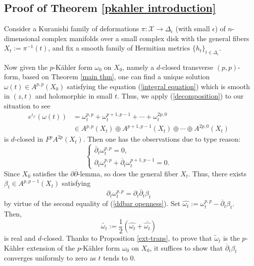 \documentclass[12pt]{amsart}
\numberwithin{equation}{section}
\theoremstyle{definition}
\theoremstyle{definition}
\theoremstyle{definition}
\renewcommand{\1}{\mathsf{1}}
\newcommand{\db}{\overline{\partial}}
\renewcommand{\>}{\rightarrow}
\newcommand{\p}{\partial}
\newcommand{\bp}{\overline\partial}
\def\p{\partial}
\theoremstyle{plain} %
\theoremstyle{plain} %
\theoremstyle{plain} %
\begin{document}
	
	
	
	\subsection{Proof of Theorem \ref{pkahler introduction}}\label{proof pkahler}
	Consider a Kuranishi family of deformations
	$\pi:\mathcal{X}\rightarrow \Delta_{\epsilon}$  (with small $\epsilon$) of $n$-dimensional complex manifolds over a small complex disk
	with the general fibers $X_t:=\pi^{-1}(t)$, and	fix a smooth family of  Hermitian metrics
	$\{h_t\}_{t \in \Delta_{\epsilon}}.$ 
    
Now given the $p$-K\"{a}hler form $\omega_0$ on $X_0$, namely a $d$-closed transverse $(p,p)$-form, based on Theorem   \ref{main thm}, one can find a unique solution $\omega(t)\in A^{p,p}(X_0)$ satisfying the equation (\ref{integral equation}) which is smooth in $(z,t)$ and holomorphic in small $t$. Thus, we apply (\ref{decomposition}) to our situation to see
	$$
	\begin{aligned}
		e^{\iota_{\varphi}}(\omega(t)) &=\omega_t^{p, p}+\omega_t^{p+1, p-1}+\cdots+\omega_t^{2p, 0} \\
		& \in A^{p, p}\left(X_{t}\right) \oplus A^{p+1, p-1}\left(X_{t}\right) \oplus \cdots \oplus A^{2p, 0}\left(X_{t}\right)
	\end{aligned}
	$$
	is $d$-closed in $F^{p}A^{2p}(X_t).$ Then one has the observations due to  type reason:
	\begin{equation}\label{ddbar openness}
		\begin{cases}
			\bp_{t}{\omega_t^{p, p}}=0,\\
			\p_t{\omega_t^{p, p}}+	\bp_{t}{\omega_t^{p+1, p-1}}=0.
		\end{cases}
	\end{equation}
	Since $X_0$ satisfies the $\p\db$-lemma, so does the general fiber
	$X_t$. Thus, there exists $\beta_t\in A^{p,p-1}(X_t)$ satisfying  $$\p_t{\omega_t^{p, p}}=\p_t\bp_{t}\beta_t$$ by virtue of the second equality of (\ref{ddbar openness}). Set
	$\widehat{\omega_t}:=\omega_t^{p, p}-\bp_{t}\beta_t$. Then,  $$\widetilde{\omega_t}:=\frac{1}{2}\left(\widehat{\omega_t}+\overline{\widehat{\omega_t}}\right)$$  is real and $d$-closed. Thanks to Proposition \ref{ext-trans}, to prove that $\widetilde{\omega}_t$ is the $p$-K\"{a}hler extension of the $p$-K\"{a}hler form $\omega_0$ on $X_0$, it suffices to show that
	$\bp_{t}\beta_t$ converges uniformly to zero as $t$ tends to $0$.
	
\end{document}
